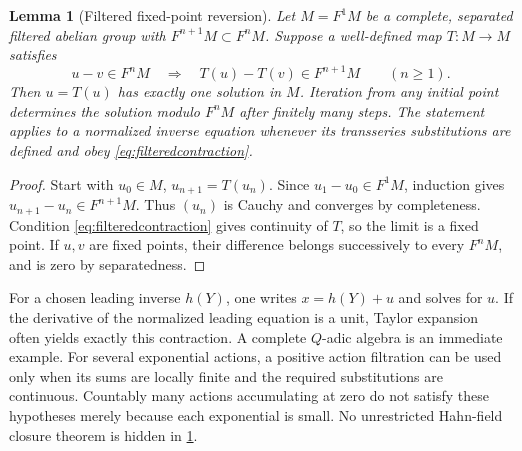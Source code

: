 \documentclass[11pt,a4paper]{article}
\numberwithin{equation}{section}
\newtheorem{lemma}[theorem]{Lemma}
\theoremstyle{definition}
\theoremstyle{remark}
\begin{document}
\begin{lemma}[Filtered fixed-point reversion]
\label{lem:filtered}
Let $M=F^1M$ be a complete, separated filtered abelian group with
$F^{n+1}M\subset F^nM$. Suppose a well-defined map $T:M\to M$ satisfies
\begin{equation}
 u-v\in F^nM\quad\Longrightarrow\quad
 T(u)-T(v)\in F^{n+1}M\qquad(n\geq1).
 \label{eq:filteredcontraction}
\end{equation}
Then $u=T(u)$ has exactly one solution in $M$. Iteration from any
initial point determines the solution modulo $F^nM$ after finitely
many steps. The statement applies to a normalized inverse equation
whenever its transseries substitutions are defined and obey
\eqref{eq:filteredcontraction}.
\end{lemma}
\begin{proof}
Start with $u_0\in M$, $u_{n+1}=T(u_n)$. Since
$u_1-u_0\in F^1M$, induction gives
$u_{n+1}-u_n\in F^{n+1}M$. Thus $(u_n)$ is Cauchy and converges by
completeness. Condition \eqref{eq:filteredcontraction} gives continuity
of $T$, so the limit is a fixed point. If $u,v$ are fixed points, their
difference belongs successively to every $F^nM$, and is zero by
separatedness.
\end{proof}

For a chosen leading inverse $h(Y)$, one writes $x=h(Y)+u$ and solves
for $u$. If the derivative of the normalized leading equation is a
unit, Taylor expansion often yields exactly this contraction.
A complete $Q$-adic algebra is an immediate example. For several
exponential actions, a positive action filtration can be used only
when its sums are locally finite and the required substitutions are
continuous. Countably many actions accumulating at zero do not
satisfy these hypotheses merely because each exponential is small.
No unrestricted Hahn-field closure theorem is hidden in
\cref{lem:filtered}.
\end{document}
